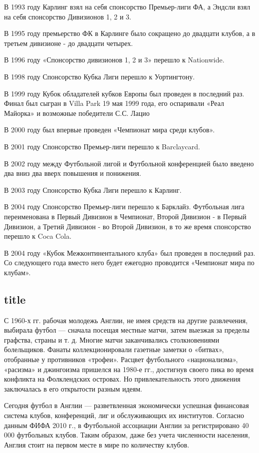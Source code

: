 В 1993 году Карлинг взял на себя спонсорство Премьер-лиги ФА, а Эндсли взял на себя спонсорство Дивизионов 1, 2 и 3.

В 1995 году премьерство ФК в Карлинге было сокращено до двадцати клубов, а в третьем дивизионе - до двадцати четырех.

В 1996 году «Спонсорство дивизионов 1, 2 и 3» перешло к Nationwide.

В 1998 году Спонсорство Кубка Лиги перешло к Уортингтону.

В 1999 году Кубок обладателей кубков Европы был проведен в последний раз. Финал был сыгран в Villa Park 19 мая 1999 года, его оспаривали «Реал Майорка» и возможные победители С.С. Лацио

В 2000 году  был впервые проведен «Чемпионат мира среди клубов».

В 2001 году Спонсорство Премьер-лиги перешло к Barclaycard.

В 2002 году между Футбольной лигой и Футбольной конференцией было введено два вниз два вверх повышения и понижения.

В 2003 году Спонсорство Кубка Лиги перешло к Карлинг.

В 2004 году Спонсорство Премьер-лиги перешло к Барклайз. Футбольная лига переименована в Первый Дивизион в Чемпионат, Второй Дивизион - в Первый Дивизион, а Третий Дивизион - во Второй Дивизион, в то же время спонсорство перешло к Coca Cola.

В 2004 году «Кубок Межконтинентального клуба» был проведен в последний раз. Со следующего года вместо него будет ежегодно проводится «Чемпионат мира по клубам». \cite{fhist}

\subsection{title}

С 1960-х гг. рабочая молодежь Англии, не имея средств на другие развлечения, выбирала футбол — сначала посещая местные матчи, затем выезжая за пределы графства, страны и т. д. Многие матчи заканчивались столкновениями болельщиков. Фанаты коллекционировали газетные заметки о «битвах», отобранные у противников «трофеи». Расцвет футбольного «национализма», «расизма» и джингоизма пришелся на 1980-е гг., достигнув своего пика во время конфликта на Фолклендских островах. Но привлекательность этого движения заключалась в его открытости разным идеям.

Сегодня футбол в Англии — разветвленная экономически успешная финансовая система клубов, конференций, лиг и обслуживающих их институтов. Согласно данным ФИФА 2010 г., в Футбольной ассоциации Англии за регистрировано 40 000 футбольных клубов. Таким образом, даже без учета численности населения, Англия стоит на первом месте в мире по количеству клубов.

